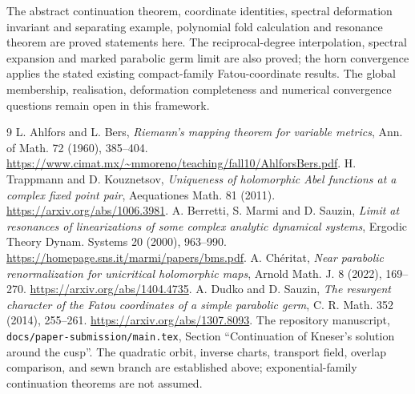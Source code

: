 \documentclass[11pt]{article}
\begin{document}
The abstract continuation theorem, coordinate identities, spectral
deformation invariant and separating example, polynomial fold
calculation and resonance theorem are proved statements here.
The reciprocal-degree interpolation, spectral expansion and marked
parabolic germ limit are also proved; the horn convergence applies
the stated existing compact-family Fatou-coordinate results.
The global membership, realisation, deformation completeness and
numerical convergence questions remain open in this framework.

\begin{thebibliography}{9}
 L. Ahlfors and L. Bers, \emph{Riemann's mapping theorem for variable
metrics}, Ann. of Math. 72 (1960), 385--404.
\url{https://www.cimat.mx/~mmoreno/teaching/fall10/AhlforsBers.pdf}.
 H. Trappmann and D. Kouznetsov, \emph{Uniqueness of holomorphic
Abel functions at a complex fixed point pair}, Aequationes Math. 81 (2011).
\url{https://arxiv.org/abs/1006.3981}.
 A. Berretti, S. Marmi and D. Sauzin,
\emph{Limit at resonances of linearizations of some complex analytic
dynamical systems}, Ergodic Theory Dynam. Systems 20 (2000), 963--990.
\url{https://homepage.sns.it/marmi/papers/bms.pdf}.
 A. Ch\'eritat, \emph{Near parabolic renormalization for
unicritical holomorphic maps}, Arnold Math. J. 8 (2022), 169--270.
\url{https://arxiv.org/abs/1404.4735}.
 A. Dudko and D. Sauzin, \emph{The resurgent character of the
Fatou coordinates of a simple parabolic germ}, C. R. Math. 352 (2014),
255--261. \url{https://arxiv.org/abs/1307.8093}.
 The repository manuscript, \texttt{docs/paper-submission/main.tex},
Section ``Continuation of Kneser's solution around the cusp''.
The quadratic orbit, inverse charts, transport field, overlap comparison,
and sewn branch are established above; exponential-family continuation
theorems are not assumed.
\end{thebibliography}
\end{document}
